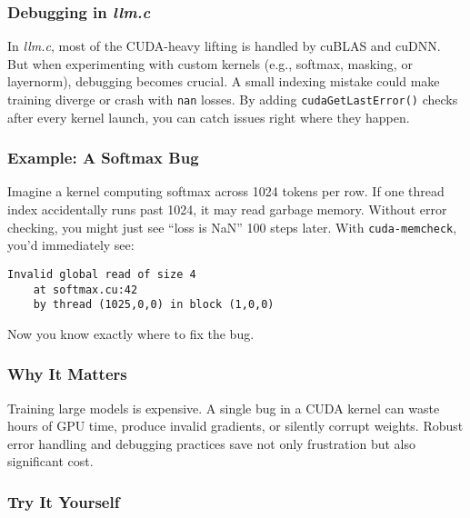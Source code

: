 \documentclass[
  letterpaper,
  DIV=11,
  numbers=noendperiod]{scrreprt}
\begin{document}
\subsubsection{\texorpdfstring{Debugging in
\emph{llm.c}}{Debugging in llm.c}}\label{debugging-in-llm.c}

In \emph{llm.c}, most of the CUDA-heavy lifting is handled by cuBLAS and
cuDNN. But when experimenting with custom kernels (e.g., softmax,
masking, or layernorm), debugging becomes crucial. A small indexing
mistake could make training diverge or crash with \texttt{nan} losses.
By adding \texttt{cudaGetLastError()} checks after every kernel launch,
you can catch issues right where they happen.

\subsubsection{Example: A Softmax Bug}\label{example-a-softmax-bug}

Imagine a kernel computing softmax across 1024 tokens per row. If one
thread index accidentally runs past 1024, it may read garbage memory.
Without error checking, you might just see ``loss is NaN'' 100 steps
later. With \texttt{cuda-memcheck}, you'd immediately see:

\begin{verbatim}
Invalid global read of size 4
    at softmax.cu:42
    by thread (1025,0,0) in block (1,0,0)
\end{verbatim}

Now you know exactly where to fix the bug.

\subsubsection{Why It Matters}\label{why-it-matters-45}

Training large models is expensive. A single bug in a CUDA kernel can
waste hours of GPU time, produce invalid gradients, or silently corrupt
weights. Robust error handling and debugging practices save not only
frustration but also significant cost.

\subsubsection{Try It Yourself}\label{try-it-yourself-57}
\end{document}
